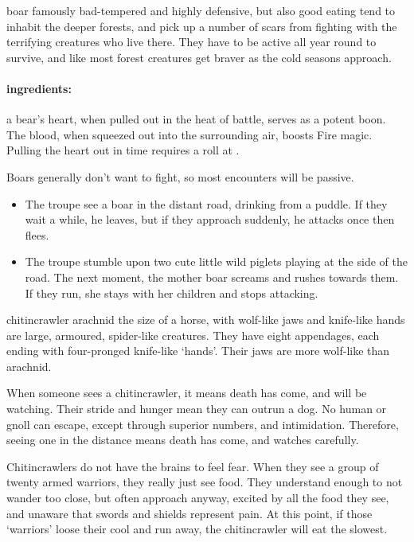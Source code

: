 \begin{multicols}{2}
  {boar}%
  {famously bad-tempered and highly defensive, but also good eating}%
tend to inhabit the deeper forests, and pick up a number of scars from fighting with the terrifying creatures who live there.
They have to be active all year round to survive, and like most forest creatures get braver as the cold seasons approach.

\boar

\paragraph{\Glspl{ingredient}:}
a bear's heart, when pulled out in the heat of battle, serves as a potent \gls{boon}.
The blood, when squeezed out into the surrounding air, boosts Fire magic.
Pulling the heart out in time requires a  roll at \tn[10].

\showEnc
Boars generally don't want to fight, so most encounters will be passive.

\begin{itemize}

  \item
  The troupe see a boar in the distant road, drinking from a puddle.
  If they wait a while, he leaves, but if they approach suddenly, he attacks once then flees.
  \item
  The troupe stumble upon two cute little wild piglets playing at the side of the road.
  The next moment, the mother boar screams and rushes towards them.
  If they run, she stays with her children and stops attacking.

\end{itemize}


  {chitincrawler}%
  {arachnid the size of a horse, with wolf-like jaws and knife-like hands}%
are large, armoured, spider-like creatures.
They have eight appendages, each ending with four-pronged knife-like `hands'.
Their jaws are more wolf-like than arachnid.

When someone sees a chitincrawler, it means death has come, and will be watching.
Their stride and hunger mean they can outrun a dog.
No human or gnoll can escape, except through superior numbers, and intimidation.
Therefore, seeing one in the distance means death has come, and watches carefully.

Chitincrawlers do not have the brains to feel fear.
When they see a group of twenty armed warriors, they really just see food.
They understand enough to not wander too close, but often approach anyway, excited by all the food they see, and unaware that swords and shields represent pain.
At this point, if those `warriors' loose their cool and run away, the chitincrawler will eat the slowest.


\end{multicols}
